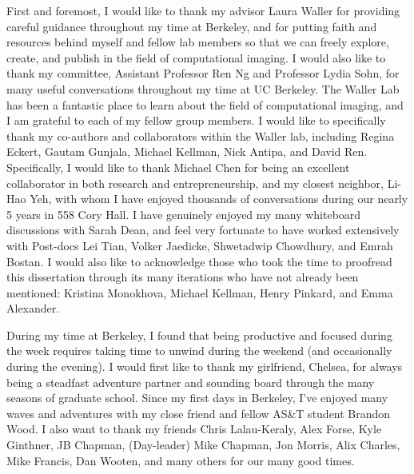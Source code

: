 \documentclass{ucbthesis}
\begin{document}
\begin{frontmatter}

\begin{dedication}
  
\end{dedication}


\tableofcontents
\clearpage
\listoffigures

\clearpage
\begin{acknowledgements}
First and foremost, I would like to thank my advisor Laura Waller for providing careful guidance throughout my time at Berkeley, and for putting faith and resources behind myself and fellow lab members so that we can freely explore, create, and publish in the field of computational imaging. I would also like to thank my committee, Assistant Professor Ren Ng and Professor Lydia Sohn, for many useful conversations throughout my time at UC Berkeley. The Waller Lab has been a fantastic place to learn about the field of computational imaging, and I am grateful to each of my fellow group members. I would like to specifically thank my co-authors and collaborators within the Waller lab, including Regina Eckert, Gautam Gunjala, Michael Kellman, Nick Antipa, and David Ren. Specifically, I would like to thank Michael Chen for being an excellent collaborator in both research and entrepreneurship, and my closest neighbor, Li-Hao Yeh, with whom I have enjoyed thousands of conversations during our nearly 5 years in 558 Cory Hall. I have genuinely enjoyed my many whiteboard discussions with Sarah Dean, and feel very fortunate to have worked extensively with Post-docs Lei Tian, Volker Jaedicke, Shwetadwip Chowdhury, and Emrah Bostan. I would also like to acknowledge those who took the time to proofread this dissertation through its many iterations who have not already been mentioned: Kristina Monokhova, Michael Kellman, Henry Pinkard, and Emma Alexander.

During my time at Berkeley, I found that being productive and focused during the week requires taking time to unwind during the weekend (and occasionally during the evening). I would first like to thank my girlfriend, Chelsea, for always being a steadfast adventure partner and sounding board through the many seasons of graduate school. Since my first days in Berkeley, I've enjoyed many waves and adventures with my close friend and fellow AS\&T student Brandon Wood. I also want to thank my friends Chris Lalau-Keraly, Alex Forse, Kyle Ginthner, JB Chapman, (Day-leader) Mike Chapman, Jon Morris, Alix Charles, Mike Francis, Dan Wooten, and many others for our many good times.


\end{acknowledgements}
\end{frontmatter}
\end{document}
